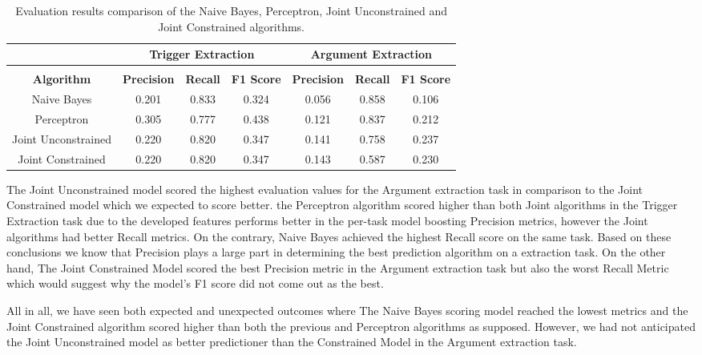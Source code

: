 \documentclass{article} %
\begin{document}
\begin{table}[!htp]
\caption{Evaluation results comparison of the Naive Bayes, Perceptron, Joint Unconstrained and Joint Constrained algorithms.}
\label{table:AllAlgorithms}
\begin{center}
\begin{tabular}{c c c c c c c}
\multicolumn{1}{c}{} & \multicolumn{3}{c}{\bf Trigger Extraction} &\multicolumn{3}{c}{\bf Argument Extraction}
\\ \hline \\
\textbf{Algorithm} & \textbf{Precision} & \textbf{Recall} & \textbf{F1 Score} & \textbf{Precision} & \textbf{Recall} & \textbf{F1 Score}\\
Naive Bayes         & 0.201 & 0.833 & 0.324 & 0.056 & 0.858 & 0.106\\
Perceptron          & 0.305 & 0.777 & 0.438 & 0.121 & 0.837 & 0.212\\
Joint Unconstrained & 0.220 & 0.820 & 0.347 & 0.141 & 0.758 & 0.237\\
Joint Constrained   & 0.220 & 0.820 & 0.347 & 0.143 & 0.587 & 0.230\\
\end{tabular}
\end{center}
\end{table}

The Joint Unconstrained model scored the highest evaluation values for the Argument extraction task in comparison to the Joint Constrained model which we expected to score better. the Perceptron algorithm scored higher than both Joint algorithms in the Trigger Extraction task due to the developed features performs better in the per-task model boosting Precision metrics, however the Joint algorithms had better Recall metrics. On the contrary, Naive Bayes achieved the highest Recall score on the same task. Based on these conclusions we know that Precision plays a large part in determining the best prediction algorithm on a extraction task. On the other hand, The Joint Constrained Model scored the best Precision metric in the Argument extraction task but also the worst Recall Metric which would suggest why the model's F1 score did not come out as the best.

All in all, we have seen both expected and unexpected outcomes where The Naive Bayes scoring model reached the lowest metrics and the Joint Constrained algorithm scored higher than both the previous and Perceptron algorithms as supposed. However, we had not anticipated the Joint Unconstrained model as better predictioner than the Constrained Model in the Argument extraction task.
\end{document}

